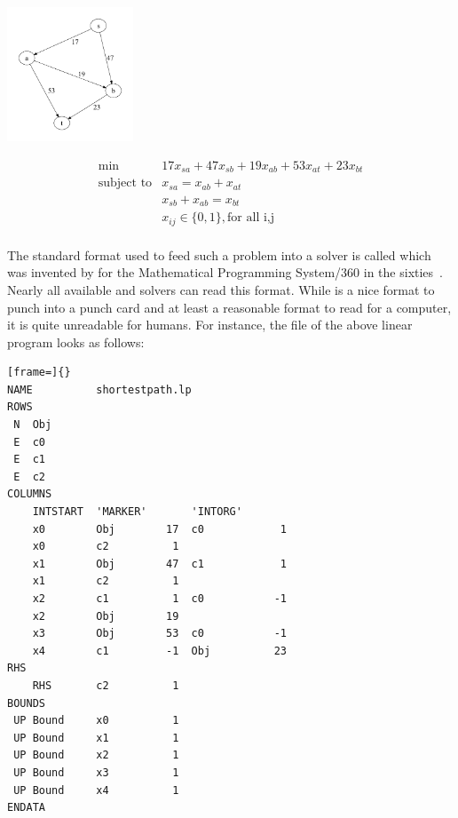 \begin{minipage}[c]{0.3\linewidth}
  \begin{center}
    \label{stexample}
    \includegraphics[height=4cm]{stexample}
  \end{center}
\end{minipage}
%
\begin{minipage}[c]{0.5\linewidth}
  $$
   \begin{array}{rll}
    \min& 17 x_{sa} + 47 x_{sb} + 19 x_{ab} + 53 x_{at} + 23 x_{bt}     \\
    \mbox{subject to}& x_{sa} = x_{ab} + x_{at} \\
    & x_{sb} + x_{ab} = x_{bt} \\
    &x_{ij} \in \{0,1\}, \mbox{for all {i,j}}\\
  \end{array}
  $$
\end{minipage}

The standard format used to feed such a problem into a solver is
called \mps which was invented by \ibm for the Mathematical
Programming System/360 in the
sixties~\cite{Kallrath2004b,Spielberg2004}.  Nearly all available \lp
and \mip solvers can read this format.  While \mps is a nice format to
punch into a punch card and at least a reasonable format to read for a
computer, it is quite unreadable for humans. For instance, the \mps
file of the above linear program looks as follows:


\begin{lstlisting}[frame=]{}
NAME          shortestpath.lp
ROWS
 N  Obj
 E  c0
 E  c1
 E  c2
COLUMNS
    INTSTART  'MARKER'       'INTORG'
    x0        Obj        17  c0            1
    x0        c2          1
    x1        Obj        47  c1            1
    x1        c2          1
    x2        c1          1  c0           -1
    x2        Obj        19
    x3        Obj        53  c0           -1
    x4        c1         -1  Obj          23
RHS
    RHS       c2          1
BOUNDS
 UP Bound     x0          1
 UP Bound     x1          1
 UP Bound     x2          1
 UP Bound     x3          1
 UP Bound     x4          1
ENDATA
\end{lstlisting}

